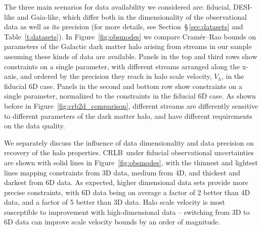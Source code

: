 \documentclass[modern]{aastex61}
\newcommand{\acronym}[1]{{\small{#1}}}
\newcommand{\CRLB}{\acronym{CRLB}}
\begin{document}
The three main scenarios for data availability we considered are: fiducial, DESI-like and Gaia-like, which differ both in the dimensionality of the observational data as well as its precision (for more details, see Section~\S\,\ref{sec:datasets} and Table~\ref{t:datasets}).
In Figure~\ref{fig:obsmodes} we compare Cram\'er--Rao bounds on parameters of the Galactic dark matter halo arising from streams in our sample assuming these kinds of data are available.
Panels in the top and third rows show constraints on a single parameter, with different streams arranged along the x-axis, and ordered by the precision they reach in halo scale velocity, $V_h$, in the fiducial 6D case.
Panels in the second and bottom row show constraints on a single parameter, normalized to the constraints in the fiducial 6D case.
As shown before in Figure~\ref{fig:crb2d_comparison}, different streams are differently sensitive to different parameters of the dark matter halo, and have different requirements on the data quality.

We separately discuss the influence of data dimensionality and data precision on recovery of the halo properties.
\CRLB\ under fiducial observational uncertainties are shown with solid lines in Figure~\ref{fig:obsmodes}, with the thinnest and lightest lines mapping constraints from 3D data, medium from 4D, and thickest and darkest from 6D data.
As expected, higher dimensional data sets provide more precise constraints, with 6D data being on average a factor of 2 better than 4D data, and a factor of 5 better than 3D data.
Halo scale velocity is most susceptible to improvement with high-dimensional data -- switching from 3D to 6D data can improve scale velocity bounds by an order of magnitude.
\end{document}
